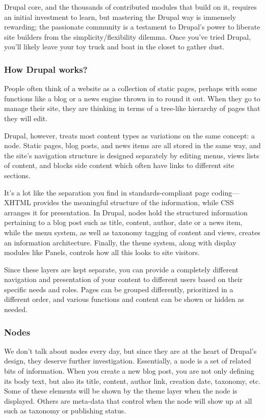 Drupal core, and the thousands of contributed modules that build on it, requires an initial investment to learn, but mastering the Drupal way is immensely rewarding; the passionate community is a testament to Drupal's power to liberate site builders from the simplicity/flexibility dilemma. Once you've tried Drupal, you'll likely leave your toy truck and boat in the closet to gather dust.

\subsubsection{How Drupal works?}

People often think of a website as a collection of static pages, perhaps with some functions like a blog or a news engine thrown in to round it out. When they go to manage their site, they are thinking in terms of a tree-like hierarchy of pages that they will edit.

Drupal, however, treats most content types as variations on the same concept: a node. Static pages, blog posts, and news items are all stored in the same way, and the site's navigation structure is designed separately by editing menus, views lists of content, and blocks side content which often have links to different site sections.

It’s a lot like the separation you find in standards-compliant page coding—XHTML provides the meaningful structure of the information, while CSS arranges it for presentation. In Drupal, nodes hold the structured information pertaining to a blog post such as title, content, author, date or a news item, while the menu system, as well as taxonomy tagging of content and views, creates an information architecture. Finally, the theme system, along with display modules like Panels, controls how all this looks to site visitors.

Since these layers are kept separate, you can provide a completely different navigation and presentation of your content to different users based on their specific needs and roles. Pages can be grouped differently, prioritized in a different order, and various functions and content can be shown or hidden as needed.

\subsubsection{Nodes}

We don't talk about nodes every day, but since they are at the heart of Drupal's design, they deserve further investigation. Essentially, a node is a set of related bits of information. When you create a new blog post, you are not only defining its body text, but also its title, content, author link, creation date, taxonomy, etc. Some of these elements will be shown by the theme layer when the node is displayed. Others are meta-data that control when the node will show up at all such as taxonomy or publishing status.

